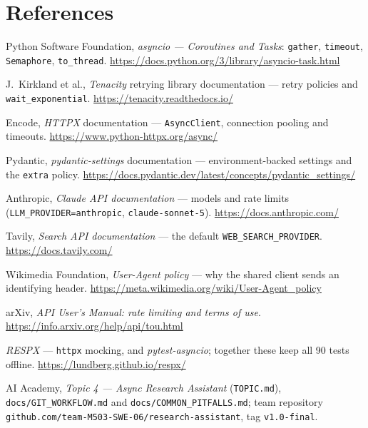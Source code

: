 \documentclass[11pt,a4paper]{article}
\newcommand{\repolink}{\texttt{github.com/team-M503-SWE-06/research-assistant}}
\begin{document}
\section*{References}

\begin{enumerate}[label={[\arabic*]},leftmargin=2.4em,itemsep=2pt]
  \item Python Software Foundation, \emph{asyncio --- Coroutines and Tasks}:
  \texttt{gather}, \texttt{timeout}, \texttt{Semaphore}, \texttt{to\_thread}.
  \url{https://docs.python.org/3/library/asyncio-task.html}
  \item J.~Kirkland et al., \emph{Tenacity} retrying library documentation --- retry
  policies and \texttt{wait\_exponential}. \url{https://tenacity.readthedocs.io/}
  \item Encode, \emph{HTTPX} documentation --- \texttt{AsyncClient}, connection pooling
  and timeouts. \url{https://www.python-httpx.org/async/}
  \item Pydantic, \emph{pydantic-settings} documentation --- environment-backed settings
  and the \texttt{extra} policy. \url{https://docs.pydantic.dev/latest/concepts/pydantic_settings/}
  \item Anthropic, \emph{Claude API documentation} --- models and rate limits
  (\texttt{LLM\_PROVIDER=anthropic}, \texttt{claude-sonnet-5}).
  \url{https://docs.anthropic.com/}
  \item Tavily, \emph{Search API documentation} --- the default
  \texttt{WEB\_SEARCH\_PROVIDER}. \url{https://docs.tavily.com/}
  \item Wikimedia Foundation, \emph{User-Agent policy} --- why the shared client sends an
  identifying header. \url{https://meta.wikimedia.org/wiki/User-Agent_policy}
  \item arXiv, \emph{API User's Manual: rate limiting and terms of use}.
  \url{https://info.arxiv.org/help/api/tou.html}
  \item \emph{RESPX} --- \texttt{httpx} mocking, and \emph{pytest-asyncio}; together these
  keep all 90 tests offline. \url{https://lundberg.github.io/respx/}
  \item AI Academy, \emph{Topic 4 --- Async Research Assistant} (\texttt{TOPIC.md}),
  \texttt{docs/GIT\_WORKFLOW.md} and \texttt{docs/COMMON\_PITFALLS.md}; team repository
  \repolink, tag \texttt{v1.0-final}.
\end{enumerate}
\end{document}
